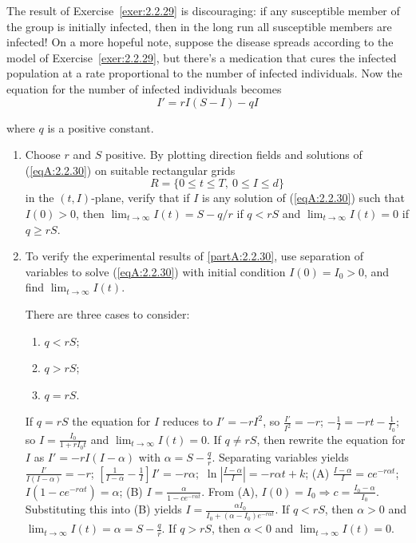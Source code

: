 \documentclass{ximera}
\begin{document}
\begin{problem}\label{exer:2.2.30}
The result of Exercise~\ref{exer:2.2.29} is discouraging: if any susceptible member of the group is initially infected, then in the long run all susceptible members are infected!
 On a more hopeful note, suppose   the disease spreads
according to the model of Exercise~\ref{exer:2.2.29}, but there's a
medication that cures the infected population at a rate proportional
to the number of infected individuals. Now the equation for the number
of infected individuals becomes
\begin{equation}\label{eqA:2.2.30}
    I'=rI(S-I)-qI
\end{equation}

where $q$ is a positive constant.
\begin{enumerate}
\item\label{partA:2.2.30} %
Choose  $r$ and $S$ positive.
By plotting  direction fields and solutions of (\ref{eqA:2.2.30}) on
suitable rectangular grids
$$
R=\{0\leq t \leq T,\ 0\leq I \leq d\}
$$
in the $(t,I)$-plane, verify that if $I$ is any solution of
(\ref{eqA:2.2.30}) such that $I(0)>0$, then $\lim_{t\to\infty}I(t)=S-q/r$
if $q<rS$ and $\lim_{t\to\infty}I(t)=0$ if $q\geq rS$.

\item %
To verify the experimental results of \ref{partA:2.2.30}, use separation of
variables to solve (\ref{eqA:2.2.30}) with initial condition $I(0)=I_0>0$, and find
$\lim_{t\to\infty}I(t)$. 
\begin{hint}There are three cases to consider:
\begin{enumerate}
    \item $q<rS$;
    \item $q>rS$; 
    \item $q=rS$.
\end{enumerate}     
\end{hint}

 

\begin{solution}
    If $q=rS$ the equation for $I$ reduces to $I'=-rI^2$, so
$\frac{I'}{ I^2}=-r$; $-\frac{1}{ I}=-rt-\frac{1}{ I_0}$;
so $I=\frac{I_0}{1+rI_0t}$ and $\lim_{t\to\infty}I(t)=0$. If $q\ne
rS$, then rewrite the equation for $I$ as $I'=-rI(I-\alpha)$ with
$\alpha=S-\frac{q}{ r}$. Separating variables yields
$\frac{I'}{ I(I-\alpha)}=-r$;\;
 $\left[\frac{1}{ I-\alpha}-\frac{1}{ I}\right]I'=-r\alpha
$;\ $\ln\left|\frac{I-\alpha}{ I}\right|=-r\alpha t+k$;\;
(A) $\frac{I-\alpha}{
I}=ce^{-r\alpha t}$; $I(1-ce^{-r\alpha t})=\alpha$;\;
(B) $I=\frac{\alpha}{ 1-ce^{-r\alpha t}}$. From (A),
 $I(0)=I_0\Rightarrow c=\frac{I_0-\alpha}{ I_0}$.
Substituting this into (B) yields
$I=\frac{\alpha I_0}{ I_0+(\alpha-I_0)e^{-r\alpha t}}$.
If $q<rS$, then $\alpha>0$ and
$\lim_{t\to\infty}I(t)=\alpha=S-\frac{q}{ r}$.
If $q>rS$, then $\alpha<0$ and $\lim_{t\to\infty}I(t)=0$.

\end{solution}
\end{enumerate}
\end{problem}
\end{document}
